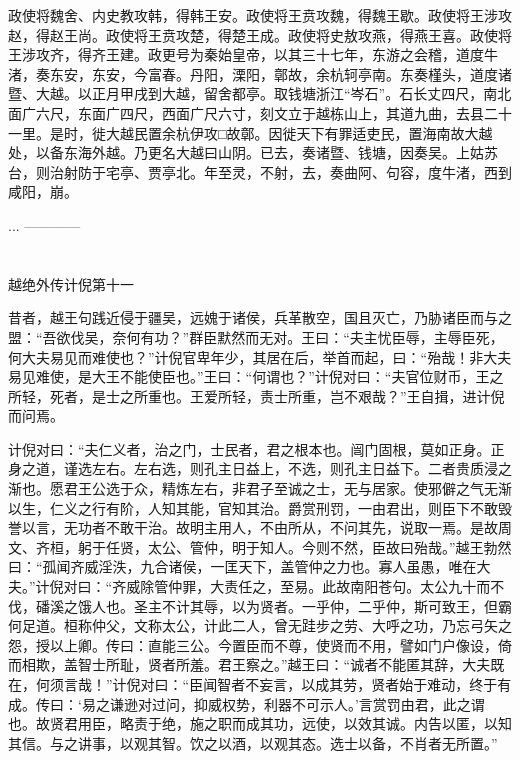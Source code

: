 \documentclass[12pt,UTF8]{ctexbook}
\begin{document}
政使将魏舍、内史教攻韩，得韩王安。政使将王贲攻魏，得魏王歇。政使将王涉攻赵，得赵王尚。政使将王贲攻楚，得楚王成。政使将史敖攻燕，得燕王喜。政使将王涉攻齐，得齐王建。政更号为秦始皇帝，以其三十七年，东游之会稽，道度牛渚，奏东安，东安，今富春。丹阳，溧阳，鄣故，余杭轲亭南。东奏槿头，道度诸暨、大越。以正月甲戌到大越，留舍都亭。取钱塘浙江“岑石”。石长丈四尺，南北面广六尺，东面广四尺，西面广尺六寸，刻文立于越栋山上，其道九曲，去县二十一里。是时，徙大越民置余杭伊攻□故鄣。因徙天下有罪适吏民，置海南故大越处，以备东海外越。乃更名大越曰山阴。已去，奏诸暨、钱塘，因奏吴。上姑苏台，则治射防于宅亭、贾亭北。年至灵，不射，去，奏曲阿、句容，度牛渚，西到咸阳，崩。

...
------------

\part{}

越绝外传计倪第十一

昔者，越王句践近侵于疆吴，远媿于诸侯，兵革散空，国且灭亡，乃胁诸臣而与之盟：“吾欲伐吴，奈何有功？”群臣默然而无对。王曰：“夫主忧臣辱，主辱臣死，何大夫易见而难使也？”计倪官卑年少，其居在后，举首而起，曰：“殆哉！非大夫易见难使，是大王不能使臣也。”王曰：“何谓也？”计倪对曰：“夫官位财币，王之所轻，死者，是士之所重也。王爱所轻，责士所重，岂不艰哉？”王自揖，进计倪而问焉。

计倪对曰：“夫仁义者，治之门，士民者，君之根本也。闿门固根，莫如正身。正身之道，谨选左右。左右选，则孔主日益上，不选，则孔主日益下。二者贵质浸之渐也。愿君王公选于众，精炼左右，非君子至诚之士，无与居家。使邪僻之气无渐以生，仁义之行有阶，人知其能，官知其治。爵赏刑罚，一由君出，则臣下不敢毁誉以言，无功者不敢干治。故明主用人，不由所从，不问其先，说取一焉。是故周文、齐桓，躬于任贤，太公、管仲，明于知人。今则不然，臣故曰殆哉。”越王勃然曰：“孤闻齐威淫泆，九合诸侯，一匡天下，盖管仲之力也。寡人虽愚，唯在大夫。”计倪对曰：“齐威除管仲罪，大责任之，至易。此故南阳苍句。太公九十而不伐，磻溪之饿人也。圣主不计其辱，以为贤者。一乎仲，二乎仲，斯可致王，但霸何足道。桓称仲父，文称太公，计此二人，曾无跬步之劳、大呼之功，乃忘弓矢之怨，授以上卿。传曰：直能三公。今置臣而不尊，使贤而不用，譬如门户像设，倚而相欺，盖智士所耻，贤者所羞。君王察之。”越王曰：“诚者不能匿其辞，大夫既在，何须言哉！”计倪对曰：“臣闻智者不妄言，以成其劳，贤者始于难动，终于有成。传曰：‘易之谦逊对过问，抑威权势，利器不可示人。’言赏罚由君，此之谓也。故贤君用臣，略责于绝，施之职而成其功，远使，以效其诚。内告以匿，以知其信。与之讲事，以观其智。饮之以酒，以观其态。选士以备，不肖者无所置。”
\end{document}
